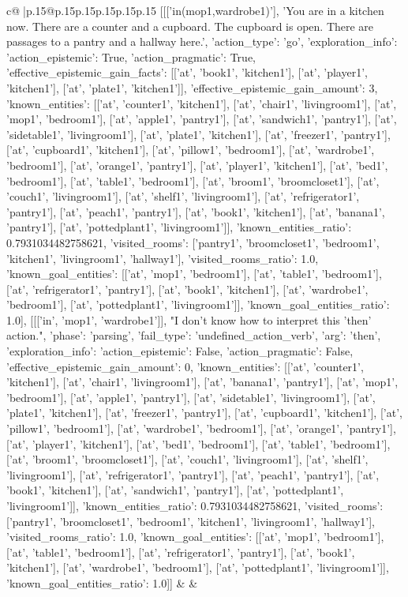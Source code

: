 \documentclass{article}
\begin{document}
{\begin{supertabular}{c@{$\;$}|p{.15\linewidth}@{}p{.15\linewidth}p{.15\linewidth}p{.15\linewidth}p{.15\linewidth}p{.15\linewidth}}
{{{	 [[['in(mop1,wardrobe1)'], 'You are in a kitchen now. There are a counter and a cupboard. The cupboard is open. There are passages to a pantry and a hallway here.', {'action_type': 'go', 'exploration_info': {'action_epistemic': True, 'action_pragmatic': True, 'effective_epistemic_gain_facts': [['at', 'book1', 'kitchen1'], ['at', 'player1', 'kitchen1'], ['at', 'plate1', 'kitchen1']], 'effective_epistemic_gain_amount': 3, 'known_entities': [['at', 'counter1', 'kitchen1'], ['at', 'chair1', 'livingroom1'], ['at', 'mop1', 'bedroom1'], ['at', 'apple1', 'pantry1'], ['at', 'sandwich1', 'pantry1'], ['at', 'sidetable1', 'livingroom1'], ['at', 'plate1', 'kitchen1'], ['at', 'freezer1', 'pantry1'], ['at', 'cupboard1', 'kitchen1'], ['at', 'pillow1', 'bedroom1'], ['at', 'wardrobe1', 'bedroom1'], ['at', 'orange1', 'pantry1'], ['at', 'player1', 'kitchen1'], ['at', 'bed1', 'bedroom1'], ['at', 'table1', 'bedroom1'], ['at', 'broom1', 'broomcloset1'], ['at', 'couch1', 'livingroom1'], ['at', 'shelf1', 'livingroom1'], ['at', 'refrigerator1', 'pantry1'], ['at', 'peach1', 'pantry1'], ['at', 'book1', 'kitchen1'], ['at', 'banana1', 'pantry1'], ['at', 'pottedplant1', 'livingroom1']], 'known_entities_ratio': 0.7931034482758621, 'visited_rooms': ['pantry1', 'broomcloset1', 'bedroom1', 'kitchen1', 'livingroom1', 'hallway1'], 'visited_rooms_ratio': 1.0, 'known_goal_entities': [['at', 'mop1', 'bedroom1'], ['at', 'table1', 'bedroom1'], ['at', 'refrigerator1', 'pantry1'], ['at', 'book1', 'kitchen1'], ['at', 'wardrobe1', 'bedroom1'], ['at', 'pottedplant1', 'livingroom1']], 'known_goal_entities_ratio': 1.0}}], [[['in', 'mop1', 'wardrobe1']], "I don't know how to interpret this 'then' action.", {'phase': 'parsing', 'fail_type': 'undefined_action_verb', 'arg': 'then', 'exploration_info': {'action_epistemic': False, 'action_pragmatic': False, 'effective_epistemic_gain_amount': 0, 'known_entities': [['at', 'counter1', 'kitchen1'], ['at', 'chair1', 'livingroom1'], ['at', 'banana1', 'pantry1'], ['at', 'mop1', 'bedroom1'], ['at', 'apple1', 'pantry1'], ['at', 'sidetable1', 'livingroom1'], ['at', 'plate1', 'kitchen1'], ['at', 'freezer1', 'pantry1'], ['at', 'cupboard1', 'kitchen1'], ['at', 'pillow1', 'bedroom1'], ['at', 'wardrobe1', 'bedroom1'], ['at', 'orange1', 'pantry1'], ['at', 'player1', 'kitchen1'], ['at', 'bed1', 'bedroom1'], ['at', 'table1', 'bedroom1'], ['at', 'broom1', 'broomcloset1'], ['at', 'couch1', 'livingroom1'], ['at', 'shelf1', 'livingroom1'], ['at', 'refrigerator1', 'pantry1'], ['at', 'peach1', 'pantry1'], ['at', 'book1', 'kitchen1'], ['at', 'sandwich1', 'pantry1'], ['at', 'pottedplant1', 'livingroom1']], 'known_entities_ratio': 0.7931034482758621, 'visited_rooms': ['pantry1', 'broomcloset1', 'bedroom1', 'kitchen1', 'livingroom1', 'hallway1'], 'visited_rooms_ratio': 1.0, 'known_goal_entities': [['at', 'mop1', 'bedroom1'], ['at', 'table1', 'bedroom1'], ['at', 'refrigerator1', 'pantry1'], ['at', 'book1', 'kitchen1'], ['at', 'wardrobe1', 'bedroom1'], ['at', 'pottedplant1', 'livingroom1']], 'known_goal_entities_ratio': 1.0}}]] 
	  } 
	   } 
	   } 
	 & & \\ 
 


\end{supertabular}}
\end{document}
